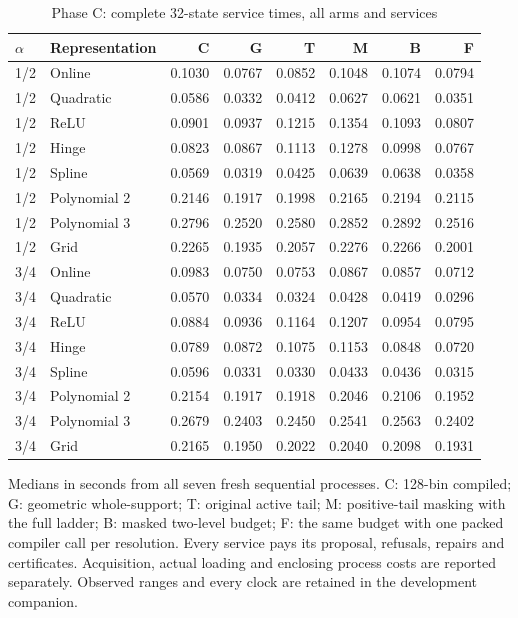 \begin{table}[t]\centering\small
\caption{Phase C: complete 32-state service times, all arms and services}
\label{tab:timing119c}
\begin{tabular}{llrrrrrr}\toprule
$\alpha$ & Representation & C & G & T & M & B & F\\\midrule
1/2 & Online & 0.1030 & 0.0767 & 0.0852 & 0.1048 & 0.1074 & 0.0794 \\
1/2 & Quadratic & 0.0586 & 0.0332 & 0.0412 & 0.0627 & 0.0621 & 0.0351 \\
1/2 & ReLU & 0.0901 & 0.0937 & 0.1215 & 0.1354 & 0.1093 & 0.0807 \\
1/2 & Hinge & 0.0823 & 0.0867 & 0.1113 & 0.1278 & 0.0998 & 0.0767 \\
1/2 & Spline & 0.0569 & 0.0319 & 0.0425 & 0.0639 & 0.0638 & 0.0358 \\
1/2 & Polynomial 2 & 0.2146 & 0.1917 & 0.1998 & 0.2165 & 0.2194 & 0.2115 \\
1/2 & Polynomial 3 & 0.2796 & 0.2520 & 0.2580 & 0.2852 & 0.2892 & 0.2516 \\
1/2 & Grid & 0.2265 & 0.1935 & 0.2057 & 0.2276 & 0.2266 & 0.2001 \\
3/4 & Online & 0.0983 & 0.0750 & 0.0753 & 0.0867 & 0.0857 & 0.0712 \\
3/4 & Quadratic & 0.0570 & 0.0334 & 0.0324 & 0.0428 & 0.0419 & 0.0296 \\
3/4 & ReLU & 0.0884 & 0.0936 & 0.1164 & 0.1207 & 0.0954 & 0.0795 \\
3/4 & Hinge & 0.0789 & 0.0872 & 0.1075 & 0.1153 & 0.0848 & 0.0720 \\
3/4 & Spline & 0.0596 & 0.0331 & 0.0330 & 0.0433 & 0.0436 & 0.0315 \\
3/4 & Polynomial 2 & 0.2154 & 0.1917 & 0.1918 & 0.2046 & 0.2106 & 0.1952 \\
3/4 & Polynomial 3 & 0.2679 & 0.2403 & 0.2450 & 0.2541 & 0.2563 & 0.2402 \\
3/4 & Grid & 0.2165 & 0.1950 & 0.2022 & 0.2040 & 0.2098 & 0.1931 \\
\bottomrule\end{tabular}
\par\smallskip\footnotesize
Medians in seconds from all seven fresh sequential processes. C: 128-bin compiled; G: geometric whole-support; T: original active tail; M: positive-tail masking with the full ladder; B: masked two-level budget; F: the same budget with one packed compiler call per resolution. Every service pays its proposal, refusals, repairs and certificates. Acquisition, actual loading and enclosing process costs are reported separately. Observed ranges and every clock are retained in the development companion.
\end{table}
